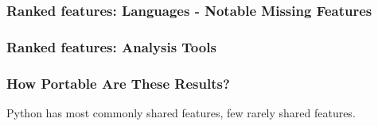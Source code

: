 
\begin{frame}[fragile]
\frametitle{Ranked features: Languages - Notable Missing Features}

\end{frame}



\begin{frame}
\frametitle{Ranked features: Analysis Tools}

\end{frame}



\begin{frame}[fragile]
\frametitle{How Portable Are These Results?}
\begin{footnotesize}Python has most commonly shared features, few rarely shared features.\end{footnotesize}
\begin{columns}[t] %


\end{columns}


\end{frame}




